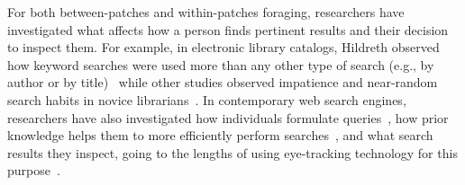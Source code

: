 For both between-patches and within-patches foraging, researchers have investigated 
what affects how a person finds pertinent results and their decision to inspect them.
For example, in electronic library catalogs,
Hildreth observed how keyword searches were used more than any other type of search (e.g., by author or by title)~\cite{hildreth1997}
while other studies observed impatience and near-random search habits in novice librarians~\cite{novotny2004don}.
In contemporary web search engines, researchers have  also 
investigated how individuals formulate queries~\cite{gross2005have, bendersky2012},
how prior knowledge helps them
to more efficiently perform searches~\cite{DeGraaf2014},
and what search results they inspect, going to the lengths
of using eye-tracking technology for this purpose~\cite{Cutrell2007, marcos2015}.
